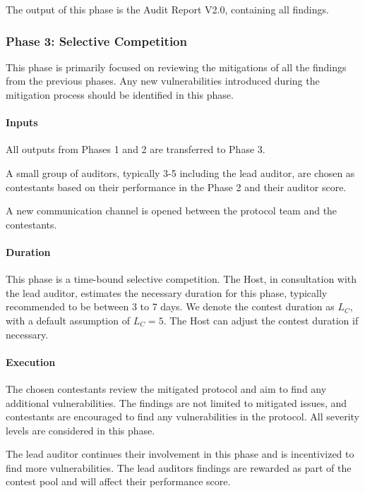 \documentclass[10pt]{extarticle}
\begin{document}
The output of this phase is the Audit Report V2.0, containing all
findings.

\subsubsection{ Phase 3: Selective
Competition}\label{433-phase-3-selective-competition}

This phase is primarily focused on reviewing the mitigations of all the
findings from the previous phases. Any new vulnerabilities introduced
during the mitigation process should be identified in this phase.

\paragraph{Inputs}\label{inputs-2}

All outputs from Phases 1 and 2 are transferred to Phase 3.

A small group of auditors, typically 3-5 including the lead auditor, are
chosen as contestants based on their performance in the Phase 2 and
their auditor score.

A new communication channel is opened between the protocol team and the
contestants.

\paragraph{Duration}\label{duration-2}

This phase is a time-bound selective competition. The Host, in
consultation with the lead auditor, estimates the necessary duration for
this phase, typically recommended to be between 3 to 7 days. We denote
the contest duration as \(L_C\), with a default assumption of
\(L_C = 5\). The Host can adjust the contest duration if necessary.

\paragraph{Execution}\label{execution-2}

The chosen contestants review the mitigated protocol and aim to find any
additional vulnerabilities. The findings are not limited to mitigated
issues, and contestants are encouraged to find any vulnerabilities in
the protocol. All severity levels are considered in this phase.

The lead auditor continues their involvement in this phase and is
incentivized to find more vulnerabilities. The lead
auditor\textquotesingle s findings are rewarded as part of the contest
pool and will affect their performance score.
\end{document}
